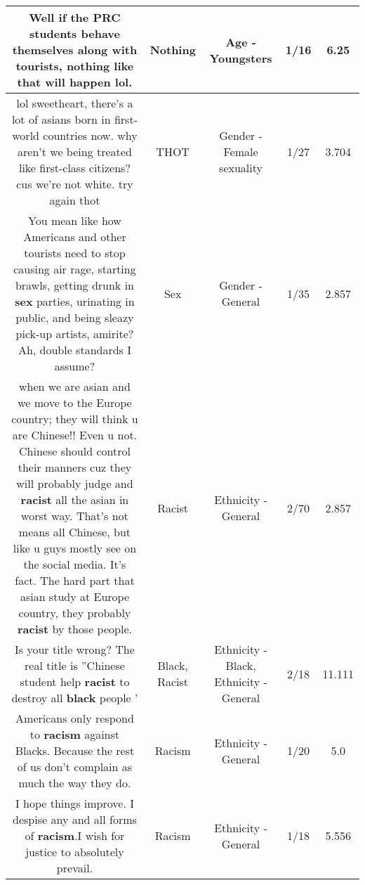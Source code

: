 \documentclass[11pt]{article}
\newlength\mylength
\begin{document}
\begin{center}
\begin{longtable}{|C{.65\mylength}|C{.30\mylength}|C{.12\mylength}|C{.12\mylength}|C{.12\mylength}|}
  \small Well if the PRC students behave themselves along with tourists, \textbf{nothing} like that will happen lol.\normalsize   & Nothing & Age - Youngsters & 1/16 & 6.25 \\  \hline
  \small lol sweetheart, there's a lot of asians born in first-world countries now. why aren't we being treated like first-class citizens? cus we're not white. try again thot\normalsize   & THOT & Gender - Female sexuality & 1/27 & 3.704 \\  \hline
  \small You mean like how Americans and other tourists need to stop causing air rage, starting brawls, getting drunk in \textbf{sex} parties, urinating in public, and being sleazy pick-up artists, amirite? Ah, double standards I assume?\normalsize   & Sex & Gender - General & 1/35 & 2.857 \\  \hline
  \small when we are asian and we move to the Europe country; they will think u are Chinese!! Even u not. Chinese should control their manners cuz they will probably judge and \textbf{racist} all the asian in worst way. That's not means all Chinese, but like u guys mostly see on the social media. It's fact. The hard part that asian study at Europe country, they probably \textbf{racist} by those people.\normalsize   & Racist & Ethnicity - General & 2/70 & 2.857 \\  \hline
  \small Is your title wrong? The real title is ''Chinese student help \textbf{racist} to destroy all \textbf{black} people '\normalsize   & Black, Racist & Ethnicity - Black, Ethnicity - General & 2/18 & 11.111 \\  \hline
  \small Americans only respond to \textbf{racism} against Blacks. Because the rest of us don't complain as much the way they do.\normalsize   & Racism & Ethnicity - General & 1/20 & 5.0 \\  \hline
  \small I hope things improve. I despise any and all forms of \textbf{racism}.I wish for justice to absolutely prevail.\normalsize   & Racism & Ethnicity - General & 1/18 & 5.556 \\  \hline

\end{longtable}
\end{center}
\end{document}
